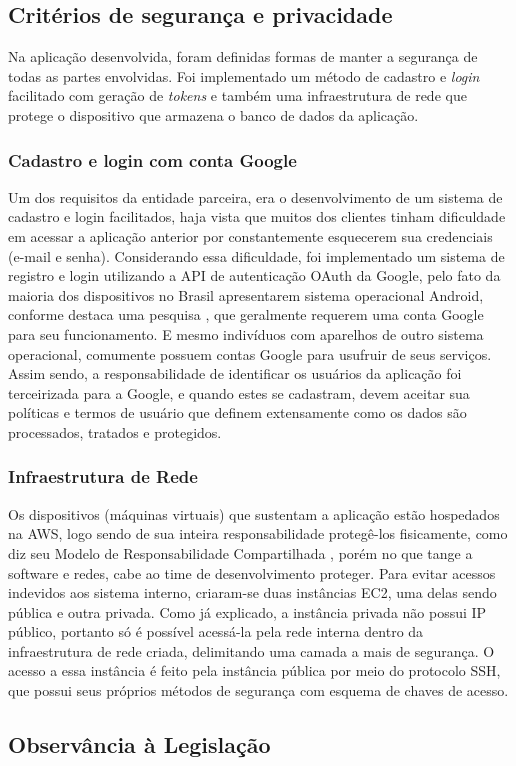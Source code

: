 \subsection{Critérios de segurança e privacidade}
Na aplicação desenvolvida, foram definidas formas de manter a segurança de todas as partes envolvidas. Foi implementado um método de cadastro e \textit{login} facilitado com geração de \textit{tokens} e também uma infraestrutura de rede que protege o dispositivo que armazena o banco de dados da aplicação.

\subsubsection{Cadastro e login com conta Google}
Um dos requisitos da entidade parceira, era o desenvolvimento de um sistema de cadastro e login facilitados, haja vista que muitos dos clientes tinham dificuldade em acessar a aplicação anterior por constantemente esquecerem sua credenciais (e-mail e senha).
Considerando essa dificuldade, foi implementado um sistema de registro e login utilizando a API de autenticação OAuth da Google, pelo fato da maioria dos dispositivos no Brasil apresentarem sistema operacional Android, conforme destaca uma pesquisa \cite{app-my-site}, que geralmente requerem uma conta Google para seu funcionamento. E mesmo indivíduos com aparelhos de outro sistema operacional, comumente possuem contas Google para usufruir de seus serviços.
Assim sendo, a responsabilidade de identificar os usuários da aplicação foi terceirizada para a Google, e quando estes se cadastram, devem aceitar sua políticas e termos de usuário que definem extensamente como os dados são processados, tratados e protegidos.

\subsubsection{Infraestrutura de Rede}
Os dispositivos (máquinas virtuais) que sustentam a aplicação estão hospedados na AWS, logo sendo de sua inteira responsabilidade protegê-los fisicamente, como diz seu Modelo de Responsabilidade Compartilhada \cite{aws-shared-responsibilities}, porém no que tange a software e redes, cabe ao time de desenvolvimento proteger.
Para evitar acessos indevidos aos sistema interno, criaram-se duas instâncias EC2, uma delas sendo pública e outra privada. Como já explicado, a instância privada não possui IP público, portanto só é possível acessá-la pela rede interna dentro da infraestrutura de rede criada, delimitando uma camada a mais de segurança.
O acesso a essa instância é feito pela instância pública por meio do protocolo SSH, que possui seus próprios métodos de segurança com esquema de chaves de acesso.
\subsection{Observância à Legislação}